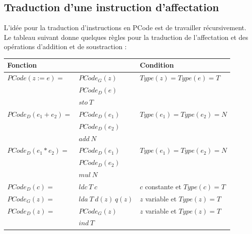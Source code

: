\documentclass[french,11pt,twoside]{article}
\begin{document}
\subsection{Traduction d'une instruction d'affectation}

L'idée pour la traduction d'instructions en PCode est de travailler récursivement. Le tableau suivant donne quelques règles pour la traduction de l'affectation et des opérations d'addition et de soustraction :

\begin{tabular}{| l l | l |}
\hline
Fonction                                 &                                                                          & Condition \\
\hline
$PCode(z:=e)=$                     & $ PCode_{G}(z)$                                                & $ Type(z)=Type(e)=T$ \\
                                              & $ PCode_{D}(e)$                                                & \\
                                              & $sto\ T$                                                             & \\
\hline
$PCode_{D}(e_{1}+e_{2})=$    & $ PCode_{D}(e_1)$                                             & $ Type(e_{1})=Type(e_{2})=N$ \\
                                             & $PCode_{D}(e_{2})$                                             & \\
                                             & $add\ N $  &  \\
\hline                                             
$PCode_{D}(e_{1}*e_{2})=$     & $ PCode_{D}(e_1)$                                              & $ Type(e_{1})=Type(e_{2})=N$ \\
                                              & $PCode_{D}(e_{2})$                                            & \\
                                              & $mul\ N $                                                       &  \\
\hline
$PCode_{D}(c)=$                    & $ ldc\ T\ c$                                                       & $c$ constante et $Type(c)=T$ \\
\hline
$PCode_{G}(z)=$                    & $ lda\ T\ d(z)\ q(z)$                                          & $z$ variable et $Type(z)=T$ \\
\hline
$PCode_{D}(z)=$                    & $ PCode_{G}(z)$                                                & $z$ variable et $Type(z)=T$ \\ 
                                              & $ind\ T$                                                            & \\
\hline
\end{tabular}
\\
\end{document}

